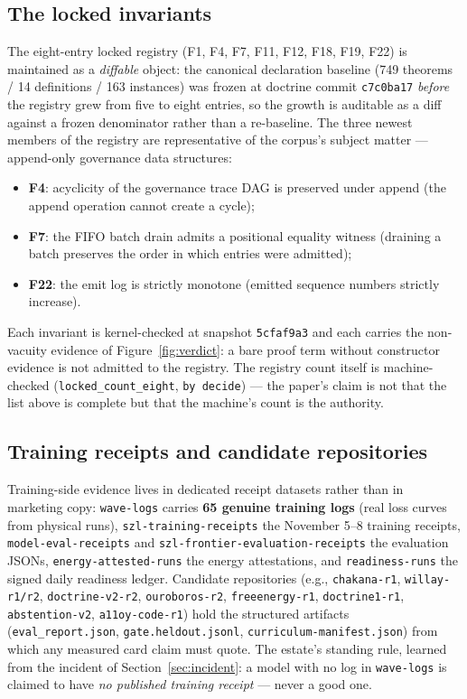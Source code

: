 
\subsection{The locked invariants}
The eight-entry locked registry (F1, F4, F7, F11, F12, F18, F19, F22) is maintained as a \emph{diffable} object: the canonical declaration baseline (749 theorems / 14 definitions / 163 instances) was frozen at doctrine commit \texttt{c7c0ba17} \emph{before} the registry grew from five to eight entries, so the growth is auditable as a diff against a frozen denominator rather than a re-baseline. The three newest members of the registry are representative of the corpus's subject matter --- append-only governance data structures:
\begin{itemize}
\item \textbf{F4}: acyclicity of the governance trace DAG is preserved under append (the append operation cannot create a cycle);
\item \textbf{F7}: the FIFO batch drain admits a positional equality witness (draining a batch preserves the order in which entries were admitted);
\item \textbf{F22}: the emit log is strictly monotone (emitted sequence numbers strictly increase).
\end{itemize}
Each invariant is kernel-checked at snapshot \texttt{5cfaf9a3} and each carries the non-vacuity evidence of Figure~\ref{fig:verdict}: a bare proof term without constructor evidence is not admitted to the registry. The registry count itself is machine-checked (\texttt{locked\_count\_eight}, \texttt{by decide}) --- the paper's claim is not that the list above is complete but that the machine's count is the authority.

\subsection{Training receipts and candidate repositories}
Training-side evidence lives in dedicated receipt datasets rather than in marketing copy: \texttt{wave-logs} carries \textbf{65 genuine training logs} (real loss curves from physical runs), \texttt{szl-training-receipts} the November 5--8 training receipts, \texttt{model-eval-receipts} and \texttt{szl-frontier-evaluation-receipts} the evaluation JSONs, \texttt{energy-attested-runs} the energy attestations, and \texttt{readiness-runs} the signed daily readiness ledger. Candidate repositories (e.g., \texttt{chakana-r1}, \texttt{willay-r1/r2}, \texttt{doctrine-v2-r2}, \texttt{ouroboros-r2}, \texttt{freeenergy-r1}, \texttt{doctrine1-r1}, \texttt{abstention-v2}, \texttt{a11oy-code-r1}) hold the structured artifacts (\texttt{eval\_report.json}, \texttt{gate.heldout.jsonl}, \texttt{curriculum-manifest.json}) from which any measured card claim must quote. The estate's standing rule, learned from the incident of Section~\ref{sec:incident}: a model with no log in \texttt{wave-logs} is claimed to have \emph{no published training receipt} --- never a good one.

